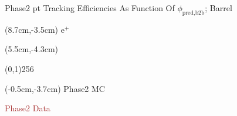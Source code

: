 \documentclass[8pt]{beamer}
\begin{document}
\begin{frame}{Phase2 pt Tracking Efficiencies As Function Of $\phi_{\textrm{pred,b2b}}$; Barrel}
	\begin{textblock*}{2cm}(8.7cm,-3.5cm)
		$\textrm{e}^+$
	\end{textblock*}
	
	
	
	\begin{textblock*}{11cm}(5.5cm,-4.3cm)
		
		\begin{center}
			\line(0,1){256}
		\end{center}
		
	\end{textblock*}
	
	
	
	\begin{textblock*}{4cm}(-0.5cm,-3.7cm)
		\textcolor{OliveGreen}{Phase2 MC}
		
		\textcolor{brown}{Phase2 Data}
	\end{textblock*}
	
	
	
	
\end{frame}
\end{document}
